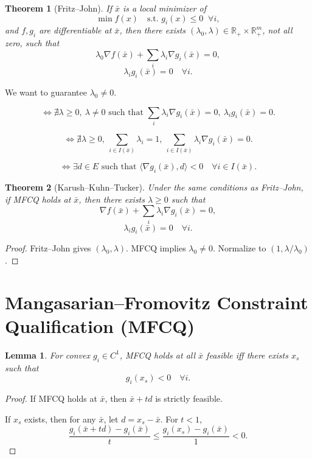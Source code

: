 \documentclass[12pt,oneside]{book}
\numberwithin{equation}{section}
\theoremstyle{definition}
\theoremstyle{plain}
\newtheorem{theorem}{Theorem}[section]
\newtheorem{lemma}{Lemma}[section]
\theoremstyle{remark}
\begin{document}
\begin{theorem}[Fritz--John]
If $\bar{x}$ is a local minimizer of
\[
\min f(x) \quad \text{s.t. } g_i(x) \le 0 \;\; \forall i,
\]
and $f,g_i$ are differentiable at $\bar{x}$, then there exists $(\lambda_0,\lambda)\in \mathbb{R}_+\times \mathbb{R}_+^m$, not all zero, such that
\[
\lambda_0 \nabla f(\bar{x}) + \sum_i \lambda_i \nabla g_i(\bar{x}) = 0,
\]
\[
\lambda_i g_i(\bar{x}) = 0 \quad \forall i.
\]
\end{theorem}

We want to guarantee $\lambda_0 \neq 0$.

\[
\Longleftrightarrow \nexists \lambda \ge 0,\ \lambda \neq 0 \text{ such that } \sum_i \lambda_i \nabla g_i(\bar{x}) = 0,\ \lambda_i g_i(\bar{x}) = 0.
\]

\[
\Longleftrightarrow \nexists \lambda \ge 0,\ \sum_{i\in I(\bar{x})} \lambda_i = 1,\ \sum_{i\in I(\bar{x})} \lambda_i \nabla g_i(\bar{x}) = 0.
\]

\[
\Longleftrightarrow \exists d \in E \text{ such that } \langle \nabla g_i(\bar{x}), d \rangle < 0 \quad \forall i \in I(\bar{x}).
\]

\begin{theorem}[Karush--Kuhn--Tucker]
Under the same conditions as Fritz--John, if MFCQ holds at $\bar{x}$, then there exists $\lambda \ge 0$ such that
\[
\nabla f(\bar{x}) + \sum_i \lambda_i \nabla g_i(\bar{x}) = 0,
\]
\[
\lambda_i g_i(\bar{x}) = 0 \quad \forall i.
\]
\end{theorem}

\begin{proof}
Fritz--John gives $(\lambda_0,\lambda)$.  
MFCQ implies $\lambda_0 \neq 0$.  
Normalize to $(1, \lambda/\lambda_0)$.
\end{proof}

\section{Mangasarian--Fromovitz Constraint Qualification (MFCQ)}

\begin{lemma}
For convex $g_i \in C^1$, MFCQ holds at all $\bar{x}$ feasible iff there exists $x_s$ such that
\[
g_i(x_s) < 0 \quad \forall i.
\]
\end{lemma}

\begin{proof}
If MFCQ holds at $\bar{x}$, then $\bar{x} + t d$ is strictly feasible.

If $x_s$ exists, then for any $\bar{x}$, let $d = x_s - \bar{x}$. For $t<1$,
\[
\frac{g_i(\bar{x} + t d) - g_i(\bar{x})}{t}
\le \frac{g_i(x_s) - g_i(\bar{x})}{1} < 0.
\]
\end{proof}
\end{document}
